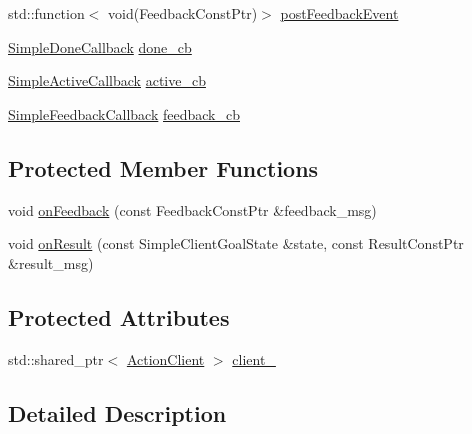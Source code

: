 \begin{DoxyCompactItemize}
std\+::function$<$ void(Feedback\+Const\+Ptr)$>$ \hyperlink{classsmacc_1_1client__bases_1_1SmaccActionClientBase_ac754fb0adfc982fe1adde0d92842a33b}{post\+Feedback\+Event}
\item 
\hyperlink{classsmacc_1_1client__bases_1_1SmaccActionClientBase_a56eb842a85c65248fda43909b1aaeac1}{Simple\+Done\+Callback} \hyperlink{classsmacc_1_1client__bases_1_1SmaccActionClientBase_a39fc5030e98f1e30e9919a9d9737b78a}{done\+\_\+cb}
\item 
\hyperlink{classsmacc_1_1client__bases_1_1SmaccActionClientBase_acfd06f7c33418c03a340e74b00a4dddc}{Simple\+Active\+Callback} \hyperlink{classsmacc_1_1client__bases_1_1SmaccActionClientBase_a8aada706b9b8ca50792b48c2f990394a}{active\+\_\+cb}
\item 
\hyperlink{classsmacc_1_1client__bases_1_1SmaccActionClientBase_a207f1655464affc35459f47a35d04069}{Simple\+Feedback\+Callback} \hyperlink{classsmacc_1_1client__bases_1_1SmaccActionClientBase_a978629b407530f1b7d266a009eff664b}{feedback\+\_\+cb}
\end{DoxyCompactItemize}
\subsection*{Protected Member Functions}
\begin{DoxyCompactItemize}
\item 
void \hyperlink{classsmacc_1_1client__bases_1_1SmaccActionClientBase_a5a88fd084076729e9cb864e45338af47}{on\+Feedback} (const Feedback\+Const\+Ptr \&feedback\+\_\+msg)
\item 
void \hyperlink{classsmacc_1_1client__bases_1_1SmaccActionClientBase_a39b897cf72ee070e4172cf76cdd53d5e}{on\+Result} (const Simple\+Client\+Goal\+State \&state, const Result\+Const\+Ptr \&result\+\_\+msg)
\end{DoxyCompactItemize}
\subsection*{Protected Attributes}
\begin{DoxyCompactItemize}
\item 
std\+::shared\+\_\+ptr$<$ \hyperlink{classsmacc_1_1client__bases_1_1SmaccActionClientBase_ab4cb0717885b95d577f82f4133db7f5f}{Action\+Client} $>$ \hyperlink{classsmacc_1_1client__bases_1_1SmaccActionClientBase_ac0c1dd56420ecb53cf0c90cd8bef1b4c}{client\+\_\+}
\end{DoxyCompactItemize}


\subsection{Detailed Description}
